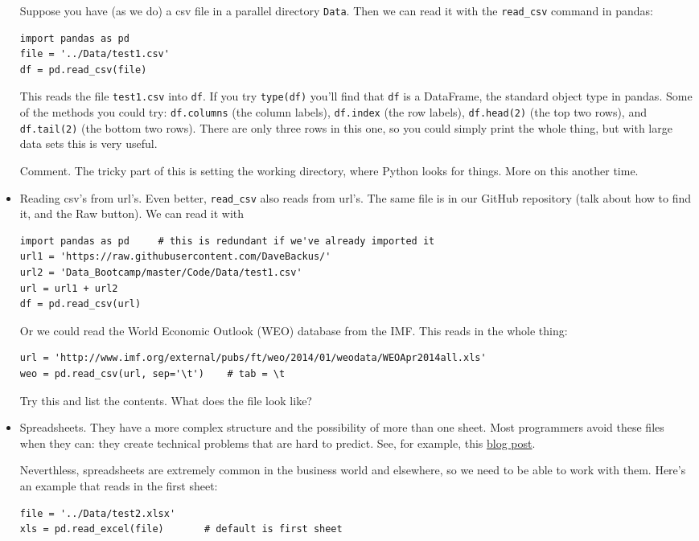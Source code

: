 \documentclass[11pt]{article}
\begin{document}
\begin{itemize}
Suppose you have (as we do) a csv file in a parallel directory {\tt Data}.
Then we can read it with the \verb:read_csv: command in pandas:
\begin{verbatim}
import pandas as pd
file = '../Data/test1.csv'
df = pd.read_csv(file)
\end{verbatim}
This reads the file {\tt test1.csv} into {\tt df}.
If you try {\tt type(df)} you'll find that {\tt df} is a DataFrame,
the standard object type in pandas.
Some of the methods you could try:
{\tt df.columns} (the column labels),
{\tt df.index} (the row labels),
{\tt df.head(2)} (the top two rows),
and {\tt df.tail(2)} (the bottom two rows).
There are only three rows in this one, so you could simply
print the whole thing, but with large data sets this is very useful.

{Comment.}
The tricky part of this is setting the working directory,
where Python looks for things.
More on this another time.


\item Reading csv's from url's.
Even better, {\tt read\_csv} also reads from url's.
The same file is in our GitHub repository (talk about how to find it,
and the Raw button).
We can read it with
\begin{verbatim}
import pandas as pd     # this is redundant if we've already imported it
url1 = 'https://raw.githubusercontent.com/DaveBackus/'
url2 = 'Data_Bootcamp/master/Code/Data/test1.csv'
url = url1 + url2
df = pd.read_csv(url)
\end{verbatim}
Or we could read the World Economic Outlook (WEO) database from the IMF.
This reads in the whole thing:
\begin{verbatim}
url = 'http://www.imf.org/external/pubs/ft/weo/2014/01/weodata/WEOApr2014all.xls'
weo = pd.read_csv(url, sep='\t')    # tab = \t
\end{verbatim}
Try this and list the contents.
What does the file look like?

\item Spreadsheets.  They have a more complex structure and the possibility
of more than one sheet.
Most programmers avoid these files when they can:  they create technical problems
that are hard to predict.
See, for example, this 
\href{http://www.win-vector.com/blog/2014/11/excel-spreadsheets-are-hard-to-get-right/}{blog post}.

Neverthless, spreadsheets are extremely common in the business world and elsewhere, 
so we need to be able to work with them.  
Here's an example that reads in the first sheet:
\begin{verbatim}
file = '../Data/test2.xlsx'
xls = pd.read_excel(file)       # default is first sheet
\end{verbatim}



\end{itemize}
\end{document}
